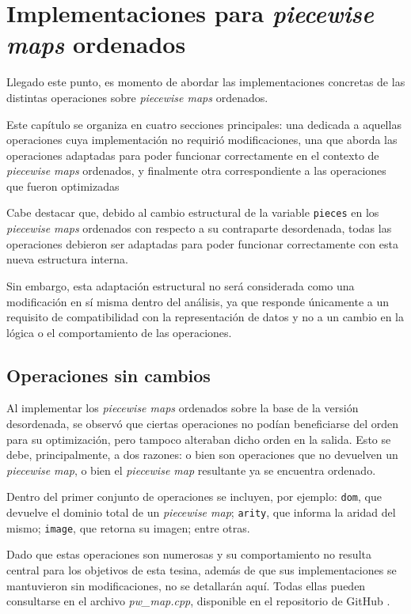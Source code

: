 \chapter{Implementaciones para \textit{piecewise maps} ordenados}

Llegado este punto, es momento de abordar las implementaciones concretas de las distintas operaciones sobre \textit{piecewise maps} ordenados. 

Este capítulo se organiza en cuatro secciones principales: una dedicada a aquellas operaciones cuya implementación no requirió modificaciones, una que aborda las operaciones adaptadas para poder funcionar correctamente en el contexto de \textit{piecewise maps} ordenados, y finalmente otra correspondiente a las operaciones que fueron optimizadas

Cabe destacar que, debido al cambio estructural de la variable \texttt{pieces} en los \textit{piecewise maps} ordenados con respecto a su contraparte desordenada, todas las operaciones debieron ser adaptadas para poder funcionar correctamente con esta nueva estructura interna.

Sin embargo, esta adaptación estructural no será considerada como una modificación en sí misma dentro del análisis, ya que responde únicamente a un requisito de compatibilidad con la representación de datos y no a un cambio en la lógica o el comportamiento de las operaciones.


\section{Operaciones sin cambios}

Al implementar los \textit{piecewise maps} ordenados sobre la base de la versión desordenada, se observó que ciertas operaciones no podían beneficiarse del orden para su optimización, pero tampoco alteraban dicho orden en la salida. Esto se debe, principalmente, a dos razones: o bien son operaciones que no devuelven un \textit{piecewise map}, o bien el \textit{piecewise map} resultante ya se encuentra ordenado.

Dentro del primer conjunto de operaciones se incluyen, por ejemplo: \texttt{dom}, que devuelve el dominio total de un \textit{piecewise map}; \texttt{arity}, que informa la aridad del mismo; \texttt{image}, que retorna su imagen; entre otras.

Dado que estas operaciones son numerosas y su comportamiento no resulta central para los objetivos de esta tesina, además de que sus implementaciones se mantuvieron sin modificaciones, no se detallarán aquí. Todas ellas pueden consultarse en el archivo \textit{pw\_map.cpp}, disponible en el repositorio de GitHub \cite{sbg}.

